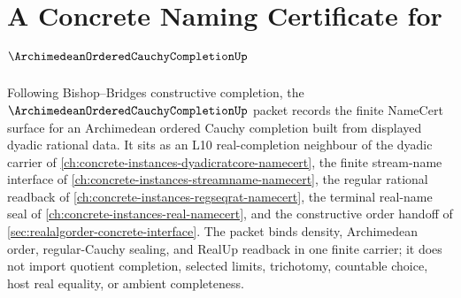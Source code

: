 \chapter{A Concrete Naming Certificate for $\ArchimedeanOrderedCauchyCompletionUp$}
\label{ch:concrete-instances-archimedean-ordered-cauchy-completion-namecert}

Following Bishop--Bridges constructive completion, the $\ArchimedeanOrderedCauchyCompletionUp$ packet records the finite NameCert surface for an Archimedean ordered Cauchy completion built from displayed dyadic rational data. It sits as an L10 real-completion neighbour of the dyadic carrier of \autoref{ch:concrete-instances-dyadicratcore-namecert}, the finite stream-name interface of \autoref{ch:concrete-instances-streamname-namecert}, the regular rational readback of \autoref{ch:concrete-instances-regseqrat-namecert}, the terminal real-name seal of \autoref{ch:concrete-instances-real-namecert}, and the constructive order handoff of \autoref{sec:realalgorder-concrete-interface}. The packet binds density, Archimedean order, regular-Cauchy sealing, and RealUp readback in one finite carrier; it does not import quotient completion, selected limits, trichotomy, countable choice, host real equality, or ambient completeness.

